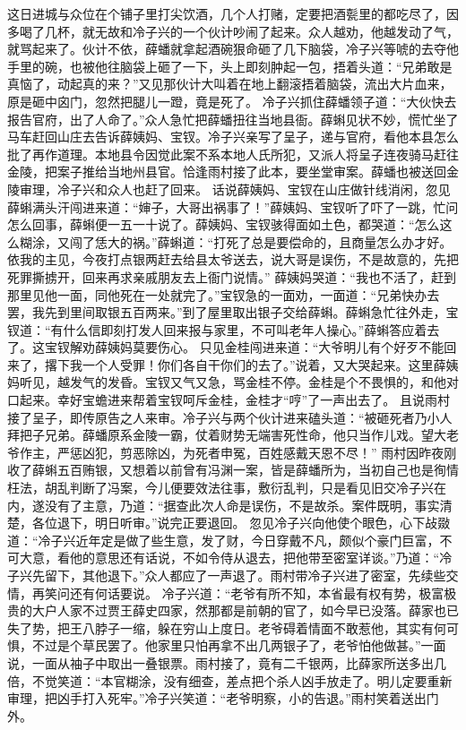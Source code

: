 \documentclass[12pt,oneside]{book}
\begin{document}
这日进城与众位在个铺子里打尖饮酒，几个人打赌，定要把酒甏里的都吃尽了，因多喝了几杯，就无故和冷子兴的一个伙计吵闹了起来。众人越劝，他越发动了气，就骂起来了。伙计不依，薛蟠就拿起酒碗狠命砸了几下脑袋，冷子兴等唬的去夺他手里的碗，也被他往脑袋上砸了一下，头上即刻肿起一包，捂着头道：“兄弟敢是真恼了，动起真的来？”又见那伙计大叫着在地上翻滚捂着脑袋，流出大片血来，原是砸中囟门，忽然把腿儿一蹬，竟是死了。
冷子兴抓住薛蟠领子道：“大伙快去报告官府，出了人命了。”众人急忙把薛蟠扭往当地县衙。薛蝌见状不妙，慌忙坐了马车赶回山庄去告诉薛姨妈、宝钗。冷子兴亲写了呈子，递与官府，看他本县怎么批了再作道理。本地县令因觉此案不系本地人氏所犯，又派人将呈子连夜骑马赶往金陵，把案子推给当地州县官。恰逢雨村接了此本，要坐堂审案。薛蟠也被送回金陵审理，冷子兴和众人也赶了回来。
话说薛姨妈、宝钗在山庄做针线消闲，忽见薛蝌满头汗闯进来道：“婶子，大哥出祸事了！”薛姨妈、宝钗听了吓了一跳，忙问怎么回事，薛蝌便一五一十说了。薛姨妈、宝钗骇得面如土色，都哭道：“怎么这么糊涂，又闯了恁大的祸。”薛蝌道：“打死了总是要偿命的，且商量怎么办才好。依我的主见，今夜打点银两赶去给县太爷送去，说大哥是误伤，不是故意的，先把死罪撕掳开，回来再求亲戚朋友去上衙门说情。”
薛姨妈哭道：“我也不活了，赶到那里见他一面，同他死在一处就完了。”宝钗急的一面劝，一面道：“兄弟快办去罢，我先到里间取银五百两来。”到了屋里取出银子交给薛蝌。薛蝌急忙往外走，宝钗道：“有什么信即刻打发人回来报与家里，不可叫老年人操心。”薛蝌答应着去了。这宝钗解劝薛姨妈莫要伤心。
只见金桂闯进来道：“大爷明儿有个好歹不能回来了，撂下我一个人受罪！你们各自干你们的去了。”说着，又大哭起来。这里薛姨妈听见，越发气的发昏。宝钗又气又急，骂金桂不停。金桂是个不畏惧的，和他对口起来。幸好宝蟾进来帮着宝钗呵斥金桂，金桂才“哼”了一声出去了。
且说雨村接了呈子，即传原告之人来审。冷子兴与两个伙计进来磕头道：“被砸死者乃小人拜把子兄弟。薛蟠原系金陵一霸，仗着财势无端害死性命，他只当作儿戏。望大老爷作主，严惩凶犯，剪恶除凶，为死者申冤，百姓感戴天恩不尽！”
雨村因昨夜刚收了薛蝌五百贿银，又想着以前曾有冯渊一案，皆是薛蟠所为，当初自己也是徇情枉法，胡乱判断了冯案，今儿便要效法往事，敷衍乱判，只是看见旧交冷子兴在内，遂没有了主意，乃道：“据查此次人命是误伤，不是故杀。案件既明，事实清楚，各位退下，明日听审。”说完正要退回。
忽见冷子兴向他使个眼色，心下敁敠道：“冷子兴近年定是做了些生意，发了财，今日穿戴不凡，颇似个豪门巨富，不可大意，看他的意思还有话说，不如令侍从退去，把他带至密室详谈。”乃道：“冷子兴先留下，其他退下。”众人都应了一声退了。雨村带冷子兴进了密室，先续些交情，再笑问还有何话要说。
冷子兴道：“老爷有所不知，本省最有权有势，极富极贵的大户人家不过贾王薛史四家，然那都是前朝的官了，如今早已没落。薛家也已失了势，把王八脖子一缩，躲在穷山上度日。老爷碍着情面不敢惹他，其实有何可惧，不过是个草民罢了。他家里只怕再拿不出几两银子了，老爷怕他做甚。”一面说，一面从袖子中取出一叠银票。雨村接了，竟有二千银两，比薛家所送多出几倍，不觉笑道：“本官糊涂，没有细查，差点把个杀人凶手放走了。明儿定要重新审理，把凶手打入死牢。”冷子兴笑道：“老爷明察，小的告退。”雨村笑着送出门外。
\end{document}

